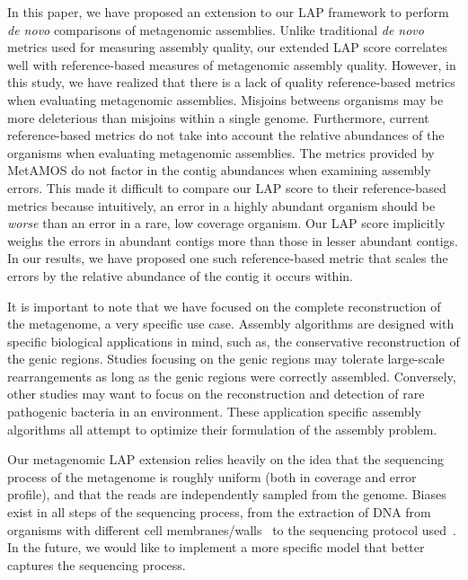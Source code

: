 \documentclass[conference]{IEEEtran}
\begin{document}
In this paper, we have proposed an extension to our LAP framework to perform \emph{de novo} comparisons of metagenomic assemblies.
Unlike traditional \emph{de novo} metrics used for measuring assembly quality, our extended LAP score correlates well with reference-based measures of metagenomic assembly quality.
However, in this study, we have realized that there is a lack of quality reference-based metrics when evaluating metagenomic assemblies.
Misjoins betweens organisms may be more deleterious than misjoins within a single genome.
Furthermore, current reference-based metrics do not take into account the relative abundances of the organisms when evaluating metagenomic assemblies.
The metrics provided by MetAMOS do not factor in the contig abundances when examining assembly errors.
This made it difficult to compare our LAP score to their reference-based metrics because intuitively, an error in a highly abundant organism should be \emph{worse} than an error in a rare, low coverage organism.
Our LAP score implicitly weighs the errors in abundant contigs more than those in lesser abundant contigs.
In our results, we have proposed one such reference-based metric that scales the errors by the relative abundance of the contig it occurs within.

It is important to note that we have focused on the complete reconstruction of the metagenome, a very specific use case.
Assembly algorithms are designed with specific biological applications in mind, such as, the conservative reconstruction of the genic regions.
Studies focusing on the genic regions may tolerate large-scale rearrangements as long as the genic regions were correctly assembled.
Conversely, other studies may want to focus on the reconstruction and detection of rare pathogenic bacteria in an environment.
These application specific assembly algorithms all attempt to optimize their formulation of the assembly problem.

Our metagenomic LAP extension relies heavily on the idea that the sequencing process of the metagenome is roughly uniform (both in coverage and error profile), and that the reads are independently sampled from the genome.
Biases exist in all steps of the sequencing process, from the extraction of DNA from organisms with different cell membranes/walls~\cite{carrigg2007dna,krsek1999comparison} to the sequencing protocol used~\cite{morgan2010metagenomic,temperton2009bias,darling2004mauve}.
In the future, we would like to implement a more specific model that better captures the sequencing process.
\end{document}
